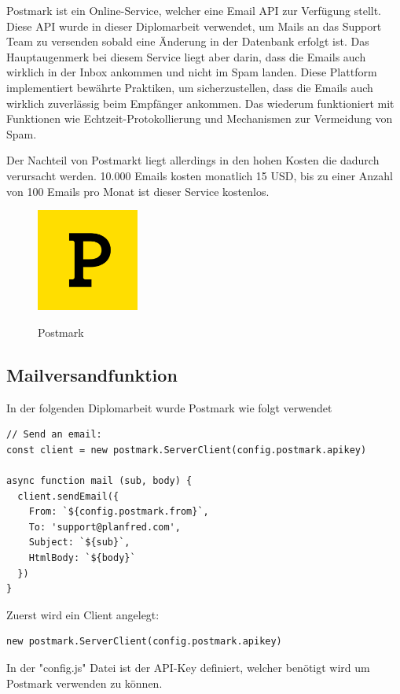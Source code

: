 Postmark ist ein Online-Service, welcher eine Email API zur Verfügung stellt. Diese API wurde in dieser Diplomarbeit verwendet, um Mails an das Support Team zu versenden sobald eine Änderung in der Datenbank erfolgt ist. Das Hauptaugenmerk bei diesem Service liegt aber darin, dass die Emails auch wirklich in der Inbox ankommen und nicht im Spam landen. Diese Plattform implementiert bewährte Praktiken, um sicherzustellen, dass die Emails auch wirklich zuverlässig beim Empfänger ankommen. Das wiederum funktioniert mit Funktionen wie Echtzeit-Protokollierung und Mechanismen zur Vermeidung von Spam.

Der Nachteil von Postmarkt liegt allerdings in den hohen Kosten die dadurch verursacht werden. 10.000 Emails kosten monatlich 15 USD, bis zu einer Anzahl von 100 Emails pro Monat ist dieser Service kostenlos.

\begin{figure}[h!]
    \centering
    \includegraphics[width=0.3\textwidth]{pics/postmark.png}
    \caption{Postmark}
    \label{fig:enter-label}
    \cite{postmark_grafik}
\end{figure}


\subsection{Mailversandfunktion}

In der folgenden Diplomarbeit wurde Postmark wie folgt verwendet


\begin{lstlisting}[caption=Implementierung Mailversandfunktion]
// Send an email:
const client = new postmark.ServerClient(config.postmark.apikey)

async function mail (sub, body) {
  client.sendEmail({
    From: `${config.postmark.from}`,
    To: 'support@planfred.com',
    Subject: `${sub}`,
    HtmlBody: `${body}`
  })
}
\end{lstlisting}

Zuerst wird ein Client angelegt:
\begin{lstlisting}
new postmark.ServerClient(config.postmark.apikey)
\end{lstlisting}
In der "config.js" Datei ist der API-Key definiert, welcher benötigt wird um Postmark verwenden zu können.

